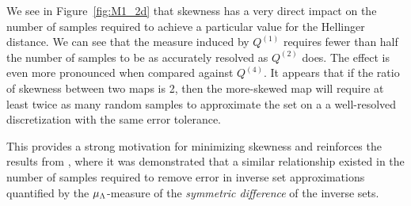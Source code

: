 We see in Figure~\ref{fig:M1_2d} that skewness has a very direct impact on the number of samples required to achieve a particular value for the Hellinger distance. 
We can see that the measure induced by $Q^{(1)}$ requires fewer than half the number of samples to be as accurately resolved as $Q^{(2)}$ does. 
The effect is even more pronounced when compared against $Q^{(4)}$.
It appears that if the ratio of skewness between two maps is 2, then the more-skewed map will require at least twice as many random samples to approximate the set on a a well-resolved discretization with the same error tolerance.

This provides a strong motivation for minimizing skewness and reinforces the results from \cite{BPW_2015}, where it was demonstrated that a similar relationship existed in the number of samples required to remove error in inverse set approximations quantified by the $\mu_{\Lambda}$-measure of the {\em symmetric difference} of the inverse sets.



